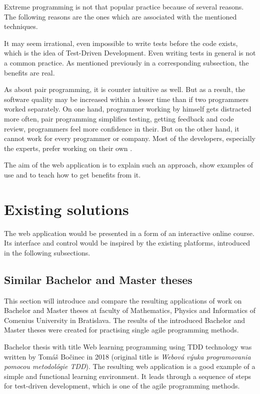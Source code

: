 Extreme programming is not that popular practice because of several reasons. The following reasons are the ones which are associated with the mentioned techniques.

It may seem irrational, even impossible to write tests before the code exists, which is the idea of Test-Driven Development. Even writing tests in general is not a common practice. As mentioned previously in a corresponding subsection, the benefits are real.

As about pair programming, it is counter intuitive as well. But as a result, the software quality may be increased within a lesser time than if two programmers worked separately. On one hand, programmer working by himself gets distracted more often, pair programming simplifies testing, getting feedback and code review, programmers feel more confidence in their. But on the other hand, it cannot work for every programmer or company. Most of the developers, especially the experts, prefer working on their own \cite[Two by Two]{xp_howto}.

The aim of the web application is to explain such an approach, show examples of use and to teach how to get benefits from it.


\section{Existing solutions}

The web application would be presented in a form of an interactive online course. Its interface and control would be inspired by the existing platforms, introduced in the following subsections.

\subsection{Similar Bachelor and Master theses}
This section will introduce and compare the resulting applications of work on Bachelor and Master theses at faculty of Mathematics, Physics and Informatics of Comenius University in Bratislava. The results of the introduced Bachelor and Master theses were created for practising single agile programming methods.

Bachelor thesis with title Web learning programming using TDD technology was written by Tomáš Bočinec in 2018 (original title is \textit{Webová výuka programovania pomocou metodológie TDD}). The resulting web application is a good example of a simple and functional learning environment. It leads through a sequence of steps for test-driven development, which is one of the agile programming methods.

